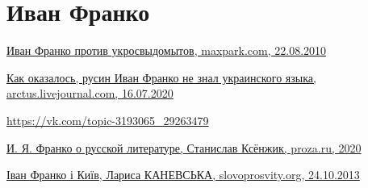  
 
 
 
 
\section{Иван Франко}

\href{https://maxpark.com/user/vosokov/content/579055}{%
Иван Франко против укросвыдомытов, maxpark.com, 22.08.2010%
%
}

\href{https://arctus.livejournal.com/1279292.html}{%
Как оказалось, русин Иван Франко не знал украинского языка, arctus.livejournal.com, 16.07.2020%
}

\url{https://vk.com/topic-3193065_29263479}

\href{https://proza.ru/2020/01/08/1411}{%
И. Я. Франко о русской литературе, Станислав Ксёнжик, proza.ru, 2020%
}

\href{http://slovoprosvity.org/2013/10/24/ivan-franko-i-kyiv/}{%
Іван Франко і Київ, Лариса КАНЕВСЬКА, slovoprosvity.org, 24.10.2013%
}
